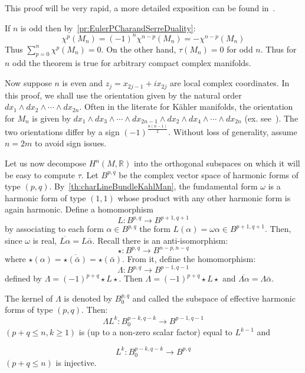 \documentclass{book}
\newenvironment{Proof}[1][]
  {\begin{ProofTcb}[#1]}
  {\end{ProofTcb}}
\newcommand{\R}{{\mathbb{R}}}
\begin{document}
\begin{Proof}
  This proof will be very rapid, a more detailed exposition can be found
  in~\cite[theorem~15.8.2]{hirzebruchTopologicalMethodsAlgebraic1995}.

  If $n$ is odd then
  by~\cref{pr:EulerPCharandSerreDuality}:
  \[
      \chi^p(M_n) = (-1)^n \chi^{n-p}(M_n) = -\chi^{n-p}(M_n)
  \]
  Thus $\sum_{p=0}^n \chi^p(M_n) = 0$. On the other hand, $\tau(M_n) = 0$ for odd $n$. Thus for $n$ odd the theorem is true for arbitrary compact complex manifolds.

  Now suppose $n$ is even and $z_j = x_{2j-1} + i x_{2j}$ are local complex coordinates.  In this proof, we
  shall use the orientation
  given by the natural order $dx_1 \wedge dx_2 \wedge \cdots \wedge dx_{2n}$. Often in the literate for K\"ahler
  manifolds, the orientation for $M_n$ is given by $dx_1 \wedge dx_3 \wedge \cdots \wedge dx_{2n-1} \wedge dx_2
  \wedge dx_4 \wedge \cdots \wedge dx_{2n}$ (ex. see~\cite{hodge1951kahler}). The two orientations differ by a
  sign $(-1)^{\frac{n(n-1)}{2}}$. Without loss of generality, assume $n = 2m$ to avoid sign issues.

  Let us now decompose $H^n(M, \R)$ into the orthogonal subspaces on which it will be easy to compute $\tau$.
  Let $B^{p,q}$ be the complex vector space of harmonic forms of type $(p,q)$.
  By~\cref{th:charLineBundleKahlMan}, the fundamental form $\omega$ is a harmonic form of type $(1,1)$ whose
  product with any other harmonic form is again harmonic. Define a homomorphism
  \[
      L: B^{p,q} \to B^{p+1,q+1}
  \]
  by associating to each form $\alpha \in B^{p,q}$ the form $L(\alpha) = \omega \alpha \in B^{p+1,q+1}$. Then,
  since $\omega$ is real, $\overline{L\alpha} = L\bar{\alpha}$. Recall there is an anti-isomorphism:
  \[
      \star: B^{p,q} \to B^{n-p,n-q}
  \]
  where $\star(\alpha) = \overline{\star(\bar{\alpha})} = \star(\bar{\alpha})$. From it, define the
  homomorphism:
  \[
      \Lambda: B^{p,q} \to B^{p-1,q-1}
  \]
  defined by $\Lambda = (-1)^{p+q}\star L\star$. Then $\Lambda = (-1)^{p+q}\star L\star$ and $\overline{\Lambda\alpha} = \Lambda\bar{\alpha}$.

  The kernel of $\Lambda$ is denoted by $B_0^{p,q}$ and called the subspace of effective harmonic forms of
  type $(p,q)$. Then:
  \[
    \Lambda L^k: B_0^{p-k,q-k} \to B^{p-1,q-1}
  \]
  $(p+q \leq n, k \geq 1)$ is (up to a non-zero scalar factor) equal to $L^{k-1}$ and

  \[
    L^k: B_0^{p-k,q-k} \to B^{p,q}
  \]
  $(p+q \leq n)$ is injective.


\end{Proof}
\end{document}
